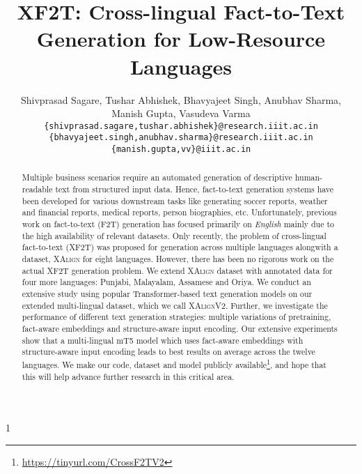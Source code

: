\documentclass[runningheads]{llncs}
\newcommand{\data}{\textsc{XAlignV2}}
\def\arxiv{1}
\begin{document}
\title{\textsc{XF2T}: Cross-lingual Fact-to-Text Generation for Low-Resource Languages}

\if\arxiv1
\author{Shivprasad Sagare, Tushar Abhishek, Bhavyajeet Singh, Anubhav Sharma,\\ Manish Gupta, Vasudeva Varma\\
\texttt{\{shivprasad.sagare,tushar.abhishek\}@research.iiit.ac.in}\\
\texttt{\{bhavyajeet.singh,anubhav.sharma\}@research.iiit.ac.in\\ \{manish.gupta,vv\}@iiit.ac.in}
}
\else
\author{}
\institute{}
\fi





\maketitle              \begin{abstract}
Multiple business scenarios require an automated generation of descriptive human-readable text from structured input data. Hence, fact-to-text generation systems have been developed for various downstream tasks like generating soccer reports, weather and financial reports, medical reports, person biographies, etc.
Unfortunately, previous work on fact-to-text (F2T) generation has focused primarily on \emph{English} mainly due to the high availability of relevant datasets. Only recently, the problem of cross-lingual fact-to-text (XF2T) was proposed for generation across multiple languages alongwith a dataset, \textsc{XAlign} for eight languages. However, there has been no rigorous work on the actual XF2T generation problem.
We extend \textsc{XAlign} dataset with annotated data for four more languages: Punjabi, Malayalam, Assamese and Oriya. We conduct an extensive study using popular Transformer-based text generation models on our extended multi-lingual dataset, which we call \data{}. Further, we investigate the performance of different text generation strategies: multiple variations of pretraining, fact-aware embeddings and structure-aware input encoding. Our extensive experiments show that a multi-lingual mT5 model which uses fact-aware embeddings with structure-aware input encoding leads to best results on average across the twelve languages. 
We make our code, dataset and model publicly available\footnote{\url{https://tinyurl.com/CrossF2TV2}\label{datafootnote}}, and hope that this will help advance further research in this critical area.

\end{abstract}
\end{document}
